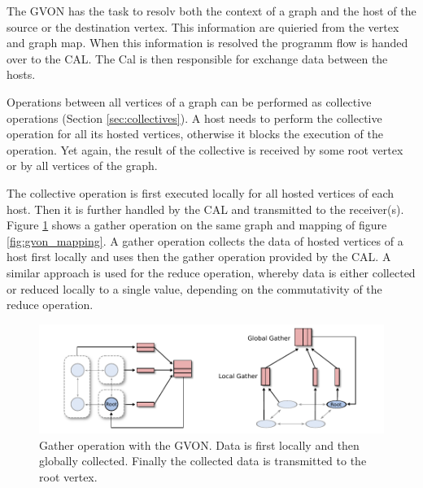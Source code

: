 The GVON has the task to resolv both the context of a graph and the
host of the source or the destination vertex. This information are
quieried from the vertex and graph map. When this information is
resolved the programm flow is handed over to the CAL. The Cal is then
responsible for exchange data between the hosts.

Operations between all vertices of a graph can be performed as
collective operations (Section \ref{sec:collectives}). A host needs to
perform the collective operation for all its hosted vertices,
otherwise it blocks the execution of the operation. Yet again,
the result of the collective is received by some root vertex
or by all vertices of the graph.


The collective operation is first executed locally for all hosted
vertices of each host. Then it is further handled by the CAL and
transmitted to the receiver(s). Figure \ref{fig:gvon_collective} shows
a gather operation on the same graph and mapping of figure
\ref{fig:gvon_mapping}. A gather operation collects the data of hosted
vertices of a host first locally and uses then the gather operation
provided by the CAL. A similar approach is used for the reduce
operation, whereby data is either collected or reduced locally to a
single value, depending on the commutativity of the reduce
operation. 



\begin{figure}[H]
  \centering \includegraphics[width=\textwidth]{graphics/30_gon_collective}
  \caption{Gather operation with the GVON. Data is first locally 
    and then globally collected. Finally the collected data
    is transmitted to the root vertex.}
  \label{fig:gvon_collective}
\end{figure}


